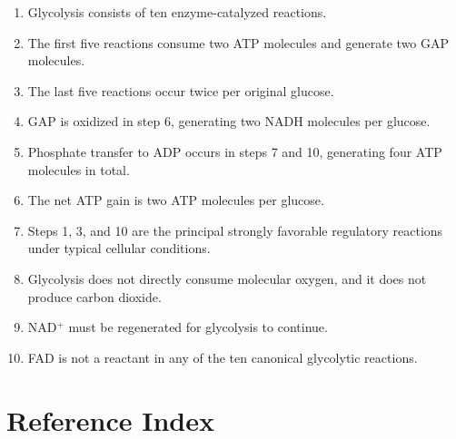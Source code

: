 \documentclass[11pt,a4paper]{article}
\begin{document}
\begin{enumerate}
  \item Glycolysis consists of ten enzyme-catalyzed reactions.

  \item The first five reactions consume two ATP molecules and
  generate two GAP molecules.

  \item The last five reactions occur twice per original glucose.

  \item GAP is oxidized in step 6, generating two NADH molecules
  per glucose.

  \item Phosphate transfer to ADP occurs in steps 7 and 10,
  generating four ATP molecules in total.

  \item The net ATP gain is two ATP molecules per glucose.

  \item Steps 1, 3, and 10 are the principal strongly favorable
  regulatory reactions under typical cellular conditions.

  \item Glycolysis does not directly consume molecular oxygen,
  and it does not produce carbon dioxide.

  \item NAD$^+$ must be regenerated for glycolysis to continue.

  \item FAD is not a reactant in any of the ten canonical
  glycolytic reactions.
\end{enumerate}

\section{Reference Index}
\label{sec:index}
\end{document}
